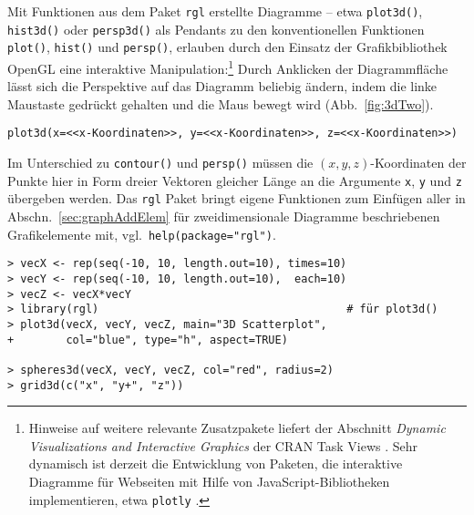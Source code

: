Mit Funktionen aus dem Paket \lstinline!rgl! \cite{Adler2011} erstellte Diagramme -- etwa \lstinline!plot3d()!, \lstinline!hist3d()! oder \lstinline!persp3d()! als Pendants zu den konventionellen Funktionen \lstinline!plot()!, \lstinline!hist()! und \lstinline!persp()!, erlauben durch den Einsatz der Grafikbibliothek OpenGL eine interaktive Manipulation:\footnote{ %
Hinweise auf weitere relevante Zusatzpakete liefert der Abschnitt \emph{Dynamic Visualizations and Interactive Graphics} der CRAN Task Views \cite{CRANtvDynamic}. Sehr dynamisch ist derzeit die Entwicklung von Paketen, die interaktive Diagramme für Webseiten mit Hilfe von JavaScript-Bibliotheken implementieren, etwa \lstinline!plotly! \cite{Sievert2015,Sievert2020}.} Durch Anklicken der Diagrammfläche lässt sich die Perspektive auf das Diagramm beliebig ändern, indem die linke Maustaste gedrückt gehalten und die Maus bewegt wird (Abb.\ \ref{fig:3dTwo}).
\begin{lstlisting}
plot3d(x=<<x-Koordinaten>>, y=<<x-Koordinaten>>, z=<<x-Koordinaten>>)
\end{lstlisting}

Im Unterschied zu \lstinline!contour()! und \lstinline!persp()! müssen die $(x, y, z)$-Koordinaten der Punkte hier in Form dreier Vektoren gleicher Länge an die Argumente \lstinline!x!, \lstinline!y! und \lstinline!z! übergeben werden. Das \lstinline!rgl! Paket bringt eigene Funktionen zum Einfügen aller in Abschn.\ \ref{sec:graphAddElem} für zweidimensionale Diagramme beschriebenen Grafikelemente mit, vgl.\ \lstinline!help(package="rgl")!.
\begin{lstlisting}
> vecX <- rep(seq(-10, 10, length.out=10), times=10)
> vecY <- rep(seq(-10, 10, length.out=10),  each=10)
> vecZ <- vecX*vecY
> library(rgl)                                      # für plot3d()
> plot3d(vecX, vecY, vecZ, main="3D Scatterplot",
+        col="blue", type="h", aspect=TRUE)

> spheres3d(vecX, vecY, vecZ, col="red", radius=2)
> grid3d(c("x", "y+", "z"))
\end{lstlisting}

